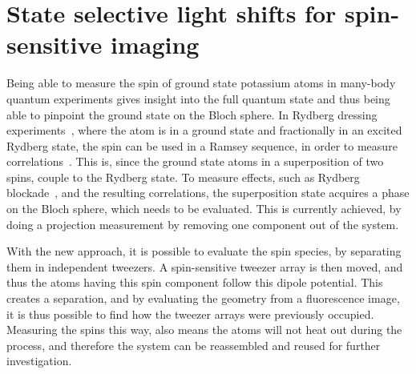\chapter{State selective light shifts for spin-sensitive imaging}%
\label{ch:spin_resolved}


Being able to measure the spin of ground state potassium atoms in many-body quantum experiments gives insight into the full quantum state and thus being able to pinpoint the ground state on the Bloch sphere. In Rydberg dressing experiments~\cite{Bouchoule2002, Pupillo2010, VanBijnen2015, Glaetzle2015, Zeiher2016, Borish2020}, where the atom is in a ground state and fractionally in an excited Rydberg state, the spin can be used in a Ramsey sequence, in order to measure correlations~\cite{Zeiher2017}.
This is, since the ground state atoms in a superposition of two spins, couple to the Rydberg state. To measure effects, such as Rydberg blockade~\cite{Jaksch2000, Urban2009}, and the resulting correlations, the superposition state acquires a phase on the Bloch sphere, which needs to be evaluated. This is currently achieved, by doing a projection measurement by removing one component out of the system.

With the new approach, it is possible to evaluate the spin species, by separating them in independent tweezers. A spin-sensitive tweezer array is then moved, and thus the atoms having this spin component follow this dipole potential. This creates a separation, and by evaluating the geometry from a fluorescence image, it is thus possible to find how the tweezer arrays were previously occupied. Measuring the spins this way, also means the atoms will not heat out during the process, and therefore the system can be reassembled and reused for further investigation.

